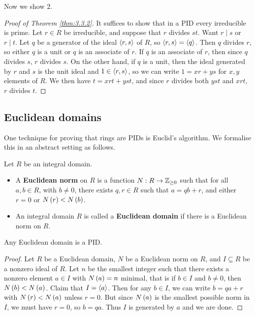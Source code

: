 Now we show $ 2 $.

\begin{proof}[Proof of Theorem \ref{thm:3.3.2}]
It suffices to show that in a PID every irreducible is prime. Let $ r \in R $ be irreducible, and suppose that $ r $ divides $ st $. Want $ r \mid s $ or $ r \mid t $. Let $ q $ be a generator of the ideal $ \left\langle r, s \right\rangle $ of $ R $, so $ \left\langle r, s \right\rangle = \left\langle q \right\rangle $. Then $ q $ divides $ r $, so either $ q $ is a unit or $ q $ is an associate of $ r $. If $ q $ is an associate of $ r $, then since $ q $ divides $ s $, $ r $ divides $ s $. On the other hand, if $ q $ is a unit, then the ideal generated by $ r $ and $ s $ is the unit ideal and $ 1 \in \left\langle r, s \right\rangle $, so we can write $ 1 = xr + ys $ for $ x, y $ elements of $ R $. We then have $ t = xrt + yst $, and since $ r $ divides both $ yst $ and $ xrt $, $ r $ divides $ t $.
\end{proof}


\subsection{Euclidean domains}

One technique for proving that rings are PIDs is Euclid's algorithm. We formalise this in an abstract setting as follows.

\begin{definition}
Let $ R $ be an integral domain.
\begin{itemize}
\item A \textbf{Euclidean norm} on $ R $ is a function $ N : R \to \mathbb{Z}_{\ge 0} $ such that for all $ a, b \in R $, with $ b \ne 0 $, there exists $ q, r \in R $ such that $ a = qb + r $, and either $ r = 0 $ or $ N\left( r \right) < N\left( b \right) $.
\item An integral domain $ R $ is called a \textbf{Euclidean domain} if there is a Euclidean norm on $ R $.
\end{itemize}
\end{definition}

\begin{theorem}
Any Euclidean domain is a PID.
\end{theorem}

\begin{proof}
Let $ R $ be a Euclidean domain, $ N $ be a Euclidean norm on $ R $, and $ I \subseteq R $ be a nonzero ideal of $ R $. Let $ n $ be the smallest integer such that there exists a nonzero element $ a \in I $ with $ N\left( a \right) = n $ minimal, that is if $ b \in I $ and $ b \ne 0 $, then $ N\left( b \right) < N\left( a \right) $. Claim that $ I = \left\langle a \right\rangle $. Then for any $ b \in I $, we can write $ b = qa + r $ with $ N\left( r \right) < N\left( a \right) $ unless $ r = 0 $. But since $ N\left( a \right) $ is the smallest possible norm in $ I $, we must have $ r = 0 $, so $ b = qa $. Thus $ I $ is generated by $ a $ and we are done.
\end{proof}

